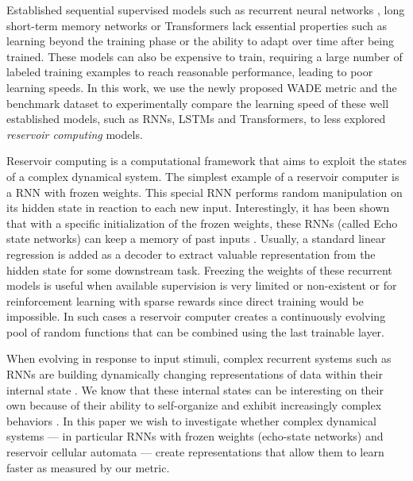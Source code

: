 Established sequential supervised models such as recurrent neural networks
\cite[RNNs; ][]{elmanFindingStructureTime1990}, long short-term memory networks
\cite[LSTMs;][]{hochreiterLongShortTermMemory1997} or Transformers
\cite{vaswaniAttentionAllYou2017} lack essential properties such as learning
beyond the training phase or the ability to adapt over time after being trained. These models can also be expensive to train, requiring a large number
of labeled training examples to reach reasonable performance, leading to poor
learning speeds. In this work, we use the newly proposed \ac{WADE} metric and the benchmark dataset to experimentally compare the learning speed of these well established models, such as RNNs, LSTMs and Transformers, to less explored {\em reservoir computing} models.

Reservoir computing is a computational framework that aims to exploit the states
of a complex dynamical system. The simplest example of a reservoir computer is a
\ac{RNN} with frozen weights. This special \ac{RNN} performs random manipulation
on its hidden state in reaction to each new input.
Interestingly, it has been shown that with a
specific initialization of the frozen weights, these \ac{RNN}s (called Echo
state networks) can keep a memory of past inputs
\cite{jaegerEchoStateApproach2001}.
Usually, a standard linear regression is
added as a decoder to extract valuable representation from the hidden state for
some downstream task. Freezing the weights of these recurrent models is useful
when available supervision is very limited or non-existent or for reinforcement
learning with sparse rewards since direct training would be impossible. In such
cases a reservoir computer creates a continuously evolving pool of random
functions that can be combined using the last trainable layer.




When evolving in response to input stimuli, complex recurrent systems such as
\acp{RNN} are building dynamically changing representations of data within their
internal state \cite{boccaraModelingComplexSystems2010}. We know that these
internal states can be interesting on their own because of their ability to
self-organize and exhibit increasingly complex behaviors
\cite{koppelAlmostMachineindependentTheory1991,
  bennettLogicalDepthPhysical1995, allenEvolutionEmergenceLearning2003,
  goldsteinEmergenceComplexSystems2011, cisnerosEvolvingStructuresComplex2019}.
In this paper we wish to investigate whether complex dynamical systems --- in particular RNNs with frozen weights (echo-state networks) \cite{jaegerEchoStateApproach2001} and reservoir cellular automata \cite{yilmazReservoirComputingUsing2014} ---
create representations that allow them to learn faster as measured by our
metric.
\vspace{-8pt}
